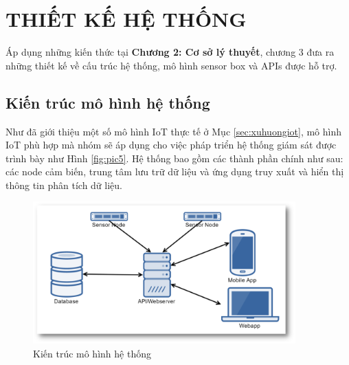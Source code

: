 \ifpdf
\graphicspath{{Chapter3/Figs/Raster/}{Chapter3/Figs/PDF/}{Chapter3/Figs/}{Chapter3/Figs/Web/}{Chapter3/Figs/Server/}{Chapter3/Figs/Mobile/}}
\else
\graphicspath{{Chapter3/Figs/Vector/}{Chapter3/Figs/}}
\fi

\chapter{THIẾT KẾ HỆ THỐNG}
\label{chap: design}
Áp dụng những kiến thức tại \textbf{Chương 2: Cơ sở lý thuyết}, chương 3 đưa ra những thiết kế về cấu trúc hệ thống, mô hình sensor box và APIs được hỗ trợ.
\section{Kiến trúc mô hình hệ thống}\label{sec:struc}
Như đã giới thiệu một số mô hình IoT thực tế ở Mục \ref{sec:xuhuongiot}, mô hình IoT phù hợp mà nhóm sẽ áp dụng cho việc pháp triển hệ thống giám sát được trình bày như Hình \ref{fig:pic5}. Hệ thống bao gồm các thành phần chính như sau: các node cảm biến, trung tâm lưu trữ dữ liệu và ứng dụng truy xuất và hiển thị thông tin phân tích dữ liệu.
\begin{figure}[H]
	\centering    
	\includegraphics[width=0.9\textwidth]{model}
	\caption[Kiến trúc mô hình hệ thống]{Kiến trúc mô hình hệ thống}
	\label{fig:system}
\end{figure}

